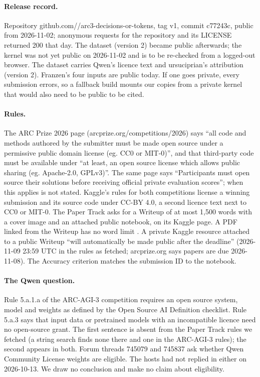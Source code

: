 \paragraph{Release record.} Repository github.com/\ownerid/arc3-decisions-or-tokens, tag v1, commit c77243c, public from 2026-11-02; anonymous requests for the repository and its LICENSE returned 200 that day. The dataset (version 2) became public afterwards; the kernel was not yet public on 2026-11-02 and is to be re-checked from a logged-out browser.
The dataset carries Qwen's licence text and ursuciprian's attribution (version 2). Franzen's four inputs are public today. If one goes private, every submission errors, so a fallback build mounts our copies from a private kernel that would also need to be public to be cited.

\paragraph{Rules.} The ARC Prize 2026 page (arcprize.org/competitions/2026) says ``all code and methods authored by the submitter must be made open source under a permissive public domain license (eg. CC0 or MIT-0)'', and that third-party code must be available under ``at least, an open source license which allows public sharing (eg. Apache-2.0, GPLv3)''. The same page says ``Participants must open source their solutions before receiving official private evaluation scores''; when this applies is not stated. Kaggle's rules for both competitions license a winning submission and its source code under CC-BY 4.0, a second licence text next to CC0 or MIT-0.
The Paper Track asks for a Writeup of at most 1,500 words with a cover image and an attached public notebook, on its Kaggle page. A PDF linked from the Writeup has no word limit \citep{kamradt2026forum748431}. A private Kaggle resource attached to a public Writeup ``will automatically be made public after the deadline'' (2026-11-09 23:59 UTC in the rules as fetched; arcprize.org says papers are due 2026-11-08). The Accuracy criterion matches the submission ID to the notebook. %

\paragraph{The Qwen question.} Rule 5.a.1.a of the ARC-AGI-3 competition requires an open source system, model and weights as defined by the Open Source AI Definition checklist. Rule 5.a.3 says that input data or pretrained models with an incompatible licence need no open-source grant. The first sentence is absent from the Paper Track rules we fetched (a string search finds none there and one in the ARC-AGI-3 rules); the second appears in both. Forum threads 745079 and 745837 ask whether Qwen Community License weights are eligible. The hosts had not replied in either on 2026-10-13. We draw no conclusion and make no claim about eligibility. %


